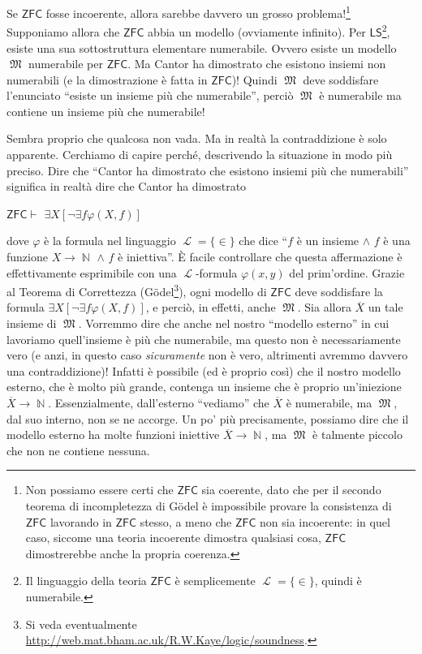 \documentclass[12pt,a4paper]{report}
\theoremstyle{definition}
\theoremstyle{num.custom-title}
\DeclareMathOperator{\LL}{\mathcal{L}}
\DeclareMathOperator{\N}{\mathbb{N}}
\DeclareMathOperator{\M}{\mathfrak{M}}
\newcommand{\ZFC}{\ensuremath{\mathsf{ZFC}}\xspace}
\newcommand{\LS}{\ensuremath{\mathsf{LS}}\xspace}
\renewcommand{\phi}{\varphi}
\begin{document}
Se \ZFC fosse incoerente, allora sarebbe davvero un grosso problema!\footnote{Non possiamo essere certi che \ZFC sia coerente, dato che per il secondo teorema di incompletezza di Gödel è impossibile provare la consistenza di \ZFC lavorando in \ZFC stesso, a meno che \ZFC non sia incoerente: in quel caso, siccome una teoria incoerente dimostra qualsiasi cosa, \ZFC dimostrerebbe anche la propria coerenza.} Supponiamo allora che \ZFC abbia un modello (ovviamente infinito). Per \LS\footnote{Il linguaggio della teoria \ZFC è semplicemente $\LL=\{\in\}$, quindi è numerabile.}, esiste una sua sottostruttura elementare numerabile. Ovvero esiste un modello $\M$ numerabile per \ZFC. Ma Cantor ha dimostrato che esistono insiemi non numerabili (e la dimostrazione è fatta in \ZFC)! Quindi $\M$ deve soddisfare l'enunciato ``esiste un insieme più che numerabile'', perciò $\M$ è numerabile ma contiene un insieme più che numerabile!

Sembra proprio che qualcosa non vada. Ma in realtà la contraddizione è solo apparente. Cerchiamo di capire perché, descrivendo la situazione in modo più preciso. 
Dire che ``Cantor ha dimostrato che esistono insiemi più che numerabili'' significa in realtà dire che Cantor ha dimostrato
\begin{center}
\ZFC $\vdash$ $\exists X [\neg \exists f \phi(X,f)]$
\end{center}
dove $\phi$ è la formula nel linguaggio $\LL=\{\in\}$ che dice ``$f$ è un insieme $\wedge$ $f$ è una funzione $X \to \N$ $\wedge$ $f$ è iniettiva''. È facile controllare che questa affermazione è effettivamente esprimibile con una $\LL$-formula $\phi(x,y)$ del prim'ordine. Grazie al Teorema di Correttezza (Gödel\footnote{Si veda eventualmente \url{http://web.mat.bham.ac.uk/R.W.Kaye/logic/soundness}.}), ogni modello di \ZFC deve soddisfare la formula $\exists X [\neg \exists f \phi(X,f)]$, e perciò, in effetti, anche $\M$. Sia allora $\overline{X}$ un tale insieme di $\M$. Vorremmo dire che anche nel nostro ``modello esterno'' in cui lavoriamo quell'insieme è più che numerabile, ma questo non è necessariamente vero (e anzi, in questo caso \emph{sicuramente} non è vero, altrimenti avremmo davvero una contraddizione)! Infatti è possibile (ed è proprio così) che il nostro modello esterno, che è molto più grande, contenga un insieme che è proprio un'iniezione $\overline{X} \to \N$. Essenzialmente, dall'esterno ``vediamo'' che $\overline{X}$ è numerabile, ma $\M$, dal suo interno, non se ne accorge. Un po' più precisamente, possiamo dire che il modello esterno ha molte funzioni iniettive $\overline{X} \to \N$, ma $\M$ è talmente piccolo che non ne contiene nessuna. 
\end{document}
